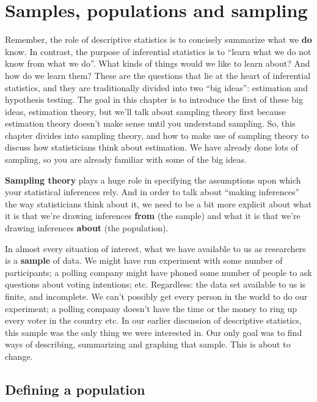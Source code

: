 \documentclass[]{book}
\begin{document}
\hypertarget{samples-populations-and-sampling}{%
\section{Samples, populations and sampling}\label{samples-populations-and-sampling}}

Remember, the role of descriptive statistics is to concisely summarize what we \textbf{do} know. In contrast, the purpose of inferential statistics is to ``learn what we do not know from what we do''. What kinds of things would we like to learn about? And how do we learn them? These are the questions that lie at the heart of inferential statistics, and they are traditionally divided into two ``big ideas'': estimation and hypothesis testing. The goal in this chapter is to introduce the first of these big ideas, estimation theory, but we'll talk about sampling theory first because estimation theory doesn't make sense until you understand sampling. So, this chapter divides into sampling theory, and how to make use of sampling theory to discuss how statisticians think about estimation. We have already done lots of sampling, so you are already familiar with some of the big ideas.

\textbf{Sampling theory} plays a huge role in specifying the assumptions upon which your statistical inferences rely. And in order to talk about ``making inferences'' the way statisticians think about it, we need to be a bit more explicit about what it is that we're drawing inferences \textbf{from} (the sample) and what it is that we're drawing inferences \textbf{about} (the population).

In almost every situation of interest, what we have available to us as researchers is a \textbf{sample} of data. We might have run experiment with some number of participants; a polling company might have phoned some number of people to ask questions about voting intentions; etc. Regardless: the data set available to us is finite, and incomplete. We can't possibly get every person in the world to do our experiment; a polling company doesn't have the time or the money to ring up every voter in the country etc. In our earlier discussion of descriptive statistics, this sample was the only thing we were interested in. Our only goal was to find ways of describing, summarizing and graphing that sample. This is about to change.

\hypertarget{defining-a-population}{%
\subsection{Defining a population}\label{defining-a-population}}
\end{document}
